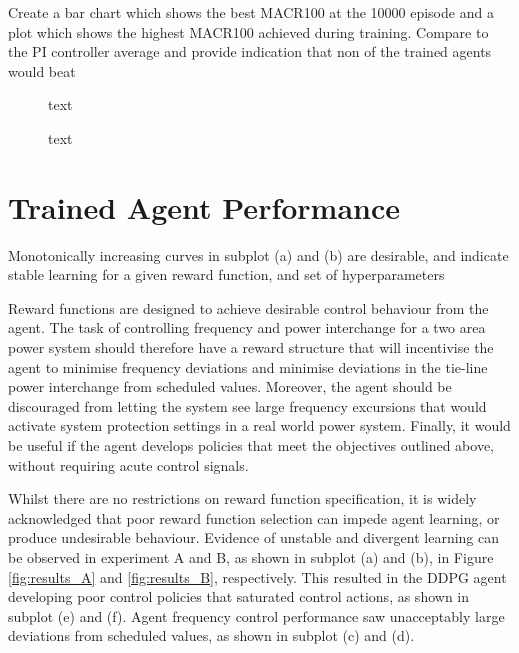 Create a bar chart which shows the best MACR100 at the 10000 episode and a plot which shows the highest MACR100 achieved during training. Compare to the PI controller average and provide indication that non of the trained agents would beat 

\begin{figure}[h]
	\begin{minipage}{0.45\textwidth}
		\centering
		\resizebox{7cm}{!}{}
		\caption{text}
	\end{minipage}
	\hspace{0.5cm}
	\begin{minipage}{0.45\textwidth}
		\resizebox{7cm}{!}{}
		\caption{text}
	\end{minipage}
\end{figure}
 
\section{Trained Agent Performance}

Monotonically increasing curves in subplot (a) and (b) are desirable, and indicate stable learning for a given reward function, and set of hyperparameters

Reward functions are designed to achieve desirable control behaviour from the agent. The task of controlling frequency and power interchange for a two area power system should therefore have a reward structure that will incentivise the agent to minimise frequency deviations and minimise deviations in the tie-line power interchange from scheduled values. Moreover, the agent should be discouraged from letting the system see large frequency excursions that would activate system protection settings in a real world power system. Finally, it would be useful if the agent develops policies that meet the objectives outlined above, without requiring acute control signals.

Whilst there are no restrictions on reward function specification, it is widely acknowledged that poor reward function selection can impede agent learning, or produce undesirable behaviour. Evidence of unstable and divergent learning can be observed in experiment A and B, as shown in subplot (a) and (b), in Figure \ref{fig:results_A} and \ref{fig:results_B}, respectively. This resulted in the DDPG agent developing poor control policies that saturated control actions, as shown in subplot (e) and (f). Agent frequency control performance saw unacceptably large deviations from scheduled values, as shown in subplot (c) and (d).

